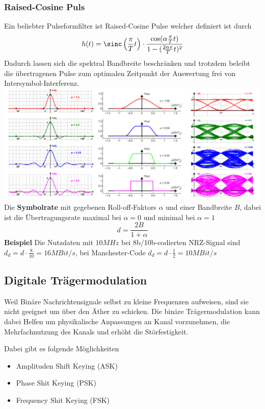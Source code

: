 \subsubsection{Raised-Cosine Puls}
Ein beliebter Pulseformfilter ist Raised-Cosine Pulse  welcher definiert ist durch 
\[
h(t) = \sinc\left(\frac{\pi}{T}t\right)\cdot\frac{\cos(\alpha\frac{\pi}{T}t)}{1- (\frac{2\alpha\pi}{T}t)^2}
\]
Dadurch lassen sich die spektral Bandbreite beschränken und trotzdem beleibt die übertragenen Pulse zum optimalen Zeitpunkt der Auswertung frei von Intersymbol-Interferenz.
\includegraphics[width=\columnwidth]{Images/raised-cosine_pulse}
Die \textbf{Symbolrate} mit gegebenen Roll-off-Faktors $\alpha$ und einer Bandbreite $B$, dabei ist die Übertragungsrate maximal bei $\alpha=0$ und minimal bei $\alpha=1$ 
\[
d = \frac{2B}{1 + \alpha}
\]
\textbf{Beispiel}
Die Nutzdaten mit $10MHz$ bei 8b/10b-codierten NRZ-Signal sind $d_d = d \cdot \frac{8}{10} = 16MBit/s$, bei Manchester-Code $d_d = d \cdot \frac{1}{2} = 10MBit/s$

\subsection{Digitale Trägermodulation}
Weil Binäre Nachrichtensignale selbst zu kleine Frequenzen aufweisen, sind sie nicht geeignet um über den Äther zu schicken. Die binäre Trägermodulation kann dabei Helfen um physikalische Anpassungen an Kanal vorzunehmen, die 
Mehrfachnutzung des Kanals und erhöht die Störfestigkeit.

Dabei gibt es folgende Möglichkeiten
\begin{itemize}[nosep]
	\item Amplituden Shift Keying (ASK)
	\item Phase Shit Keying (PSK)
	\item Frequency Shit Keying (FSK)
\end{itemize}